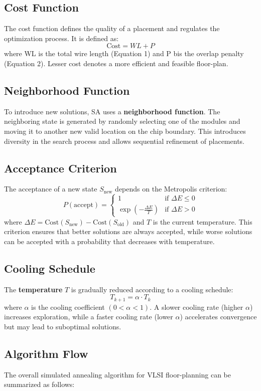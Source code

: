 \documentclass[9pt,a4paper,twoside]{rho-class/rho}
\begin{document}
\subsection{Cost Function}
The cost function defines the quality of a placement and regulates the optimization process. It is defined as: 
\[
\text{Cost} = WL + P
\]
where WL is the total wire length (Equation 1) and P bis the overlap penalty (Equation 2). Lesser cost denotes a more efficient and feasible floor-plan. 

\subsection{Neighborhood Function}
To introduce new solutions, SA uses a \textbf{neighborhood function}. The neighboring state is generated by randomly selecting one of the modules and moving it to another new valid location on the chip boundary. This introduces diversity in the search process and allows sequential refinement of placements. 

\subsection{Acceptance Criterion}
The acceptance of a new state $S_{\text{new}}$ depends on the Metropolis criterion:
\[
P(\text{accept}) =
\begin{cases} 
1 & \text{if } \Delta E \leq 0 \\
\exp\left(-\frac{\Delta E}{T}\right) & \text{if } \Delta E > 0
\end{cases}
\]
where $\Delta E = \text{Cost}(S_{\text{new}}) - \text{Cost}(S_{\text{old}})$ and $T$ is the current temperature. This criterion ensures that better solutions are always accepted, while worse solutions can be accepted with a probability that decreases with temperature.

\subsection{Cooling Schedule}
The \textbf{temperature} $T$ is gradually reduced according to a cooling schedule:
\[
T_{k+1} = \alpha \cdot T_k
\]
where $\alpha$ is the cooling coefficient $(0 < \alpha < 1)$. A slower cooling rate (higher $\alpha$) increases exploration, while a faster cooling rate (lower $\alpha$) accelerates convergence but may lead to suboptimal solutions.

\subsection{Algorithm Flow}
The overall simulated annealing algorithm for VLSI floor-planning can be summarized as follows:
\end{document}
